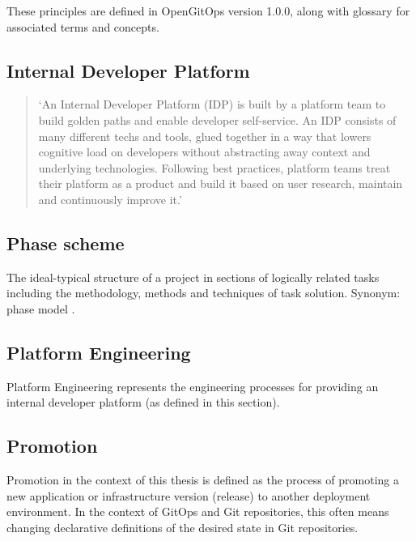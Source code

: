 
These principles are defined in OpenGitOps version 1.0.0,
along with glossary
\autocite{gitopsGlossary}
for associated terms and concepts.

\subsection*{Internal Developer Platform}

\begin{quotation}
	\noindent
	\enquote*{An Internal Developer Platform (IDP) is built by a platform team to build golden paths and enable developer self-service. An IDP consists of many different techs and tools, glued together in a way that lowers cognitive load on developers without abstracting away context and underlying technologies. Following best practices, platform teams treat their platform as a product and build it based on user research, maintain and continuously improve it.}
	\autocite{internaldeveloperplatformWhatIsIDP}
\end{quotation}

\subsection*{Phase scheme}
The ideal-typical structure of a project in sections of logically related tasks including the methodology,
methods and techniques of task solution. Synonym: phase model
\autocite{riedlManagementInformatik2019}.

\subsection*{Platform Engineering}

Platform Engineering represents the engineering processes
for providing an internal developer platform (as defined in this section).

\subsection*{Promotion}

Promotion in the context of this thesis is defined as
the process of promoting a new application or infrastructure version (release)
to another deployment environment.
In the context of GitOps and Git repositories,
this often means changing declarative definitions of the desired state in Git repositories.

